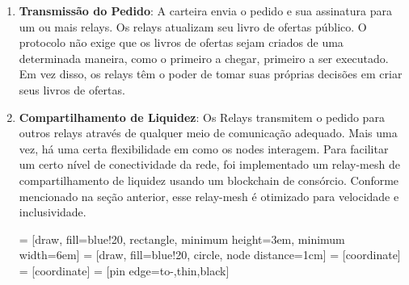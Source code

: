 \documentclass[UTF8,nofonts]{article}
\makeatletter
\newenvironment{figurehere}
 {\def\@captype{figure}}
 {}
\makeatother
\begin{document}
\begin{multicols}{2}
\begin{enumerate}
\item \textbf{Transmissão do Pedido}: A carteira envia o pedido e sua assinatura para um ou mais relays. Os relays atualizam seu livro de ofertas público. O protocolo não exige que os livros de ofertas sejam criados de uma determinada maneira, como o primeiro a chegar, primeiro a ser executado. Em vez disso, os relays têm o poder de tomar suas próprias decisões em criar seus livros de ofertas.

\item \textbf{Compartilhamento de Liquidez}: Os Relays transmitem o pedido para outros relays através de qualquer meio de comunicação adequado. Mais uma vez, há uma certa flexibilidade em como os nodes interagem. Para facilitar um certo nível de conectividade da rede, foi implementado um relay-mesh de compartilhamento de liquidez usando um blockchain de consórcio. Conforme mencionado na seção anterior, esse relay-mesh é otimizado para velocidade e inclusividade.

\begin{center}
\begin{figurehere}
\centering
{} = [draw, fill=blue!20, rectangle, 
    minimum height=3em, minimum width=6em]
 = [draw, fill=blue!20, circle, node distance=1cm]
 = [coordinate]
 = [coordinate]
 = [pin edge={to-,thin,black}]

\end{figurehere}
\end{center}
\end{enumerate}
\end{multicols}
\end{document}
